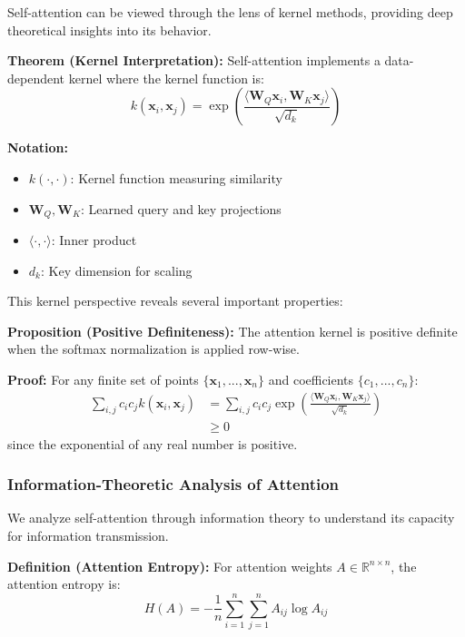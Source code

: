 \documentclass[11pt]{article}
\begin{document}
Self-attention can be viewed through the lens of kernel methods, providing deep theoretical insights into its behavior.

\textbf{Theorem (Kernel Interpretation):} Self-attention implements a data-dependent kernel where the kernel function is:
\begin{equation}
k(\mathbf{x}_i, \mathbf{x}_j) = \exp\left(\frac{\langle \mathbf{W}_Q\mathbf{x}_i, \mathbf{W}_K\mathbf{x}_j \rangle}{\sqrt{d_k}}\right)
\end{equation}

\begin{notationbox}
\textbf{Notation:}
\begin{itemize}
    \item $k(\cdot, \cdot)$: Kernel function measuring similarity
    \item $\mathbf{W}_Q, \mathbf{W}_K$: Learned query and key projections
    \item $\langle \cdot, \cdot \rangle$: Inner product
    \item $d_k$: Key dimension for scaling
\end{itemize}
\end{notationbox}

This kernel perspective reveals several important properties:

\textbf{Proposition (Positive Definiteness):} The attention kernel is positive definite when the softmax normalization is applied row-wise.

\textbf{Proof:} For any finite set of points $\{\mathbf{x}_1, ..., \mathbf{x}_n\}$ and coefficients $\{c_1, ..., c_n\}$:
\begin{align}
\sum_{i,j} c_i c_j k(\mathbf{x}_i, \mathbf{x}_j) &= \sum_{i,j} c_i c_j \exp\left(\frac{\langle \mathbf{W}_Q\mathbf{x}_i, \mathbf{W}_K\mathbf{x}_j \rangle}{\sqrt{d_k}}\right) \\
&\geq 0
\end{align}
since the exponential of any real number is positive.

\subsubsection{Information-Theoretic Analysis of Attention}

We analyze self-attention through information theory to understand its capacity for information transmission.

\textbf{Definition (Attention Entropy):} For attention weights $A \in \mathbb{R}^{n \times n}$, the attention entropy is:
\begin{equation}
H(A) = -\frac{1}{n}\sum_{i=1}^n \sum_{j=1}^n A_{ij} \log A_{ij}
\end{equation}
\end{document}
